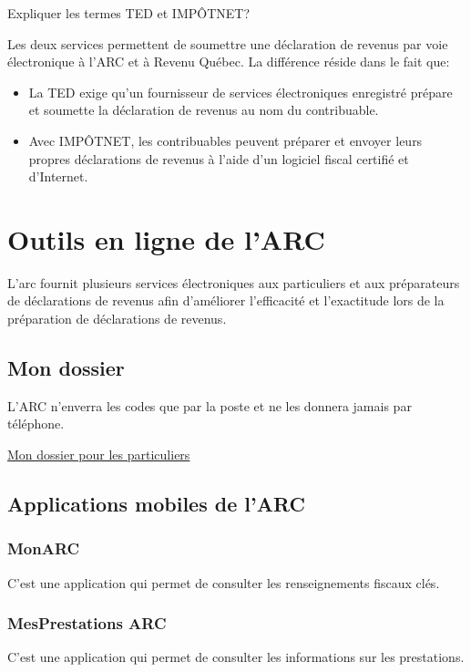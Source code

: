 \begin{question}
	Expliquer les termes TED et IMPÔTNET?
\end{question}
Les deux services permettent de soumettre une déclaration de revenus par voie électronique à l'ARC et à Revenu Québec. La différence réside dans le fait que:
\begin{itemize}
	\item La TED exige qu'un fournisseur de services électroniques enregistré prépare et soumette la déclaration de revenus au nom du contribuable. 
	\item Avec IMPÔTNET, les contribuables peuvent préparer et envoyer leurs propres déclarations de revenus à l'aide d'un logiciel fiscal certifié et d'Internet. 
\end{itemize}



\section{Outils en ligne de l'ARC}
\begin{intro}
	L'\acrshort{arc} fournit plusieurs services électroniques aux particuliers et aux préparateurs de déclarations de revenus afin d'améliorer l'efficacité et l'exactitude lors de la préparation de déclarations de revenus.
\end{intro}


\subsection{Mon dossier}
\begin{note}
	L'ARC n'enverra les codes que par la poste et ne les donnera jamais par téléphone.
\end{note}
\href{https://www.canada.ca/fr/agence-revenu/services/services-electroniques/services-numeriques-particuliers/dossier-particuliers.html}{Mon dossier pour les particuliers}


\subsection{Applications mobiles de l'ARC}
\subsubsection{MonARC}
C'est une application qui permet de consulter les renseignements fiscaux clés.

\subsubsection{MesPrestations ARC}
C'est une application qui permet de consulter les informations sur les prestations.

